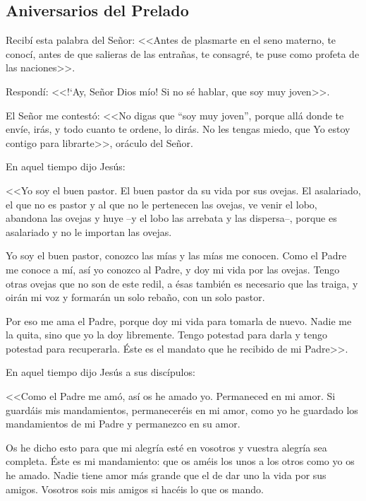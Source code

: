 \newpage

\subsection{Aniversarios del Prelado}



 Recibí esta palabra del Señor: <<Antes de 
plasmarte en el seno materno, te conocí, antes 
de que salieras de las entrañas, te consagré, te 
puse como profeta de las naciones>>. 

Respondí: 
<<!`Ay, Señor Dios mío! Si no sé hablar, que soy 
muy joven>>. 

 El Señor me contestó: <<No digas 
que “soy muy joven”, porque allá donde te 
envíe, irás, y todo cuanto te ordene, lo dirás. 
No les tengas miedo, que Yo estoy contigo 
para librarte>>, oráculo del Señor. 


 En aquel tiempo dijo Jesús: 
 
 <<Yo soy el buen 
pastor. El buen pastor da su vida por sus 
ovejas. El asalariado, el que no es pastor y al 
que no le pertenecen las ovejas, ve venir el 
lobo, abandona las ovejas y huye --y el lobo las 
arrebata y las dispersa--, porque es asalariado y 
no le importan las ovejas. 

 Yo soy el buen 
pastor, conozco las mías y las mías me 
conocen. Como el Padre me conoce a mí, así yo 
conozco al Padre, y doy mi vida por las ovejas. 
Tengo otras ovejas que no son de este redil, a 
ésas también es necesario que las traiga, y 
oirán mi voz y formarán un solo rebaño, con 
un solo pastor.  

Por eso me ama el Padre, 
porque doy mi vida para tomarla de nuevo. 
Nadie me la quita, sino que yo la doy 
libremente. Tengo potestad para darla y tengo 
potestad para recuperarla. Éste es el mandato 
que he recibido de mi Padre>>. 



 En aquel tiempo dijo Jesús a sus discípulos:  


<<Como el Padre me amó, así os he amado yo. 
Permaneced en mi amor. Si guardáis mis 
mandamientos, permaneceréis en mi amor, 
como yo he guardado los mandamientos de mi 
Padre y permanezco en su amor. 

Os he dicho 
esto para que mi alegría esté en vosotros y 
vuestra alegría sea completa. Éste es mi 
mandamiento: que os améis los unos a los 
otros como yo os he amado. Nadie tiene amor 
más grande que el de dar uno la vida por sus 
amigos. Vosotros sois mis amigos si hacéis lo 
que os mando.  

